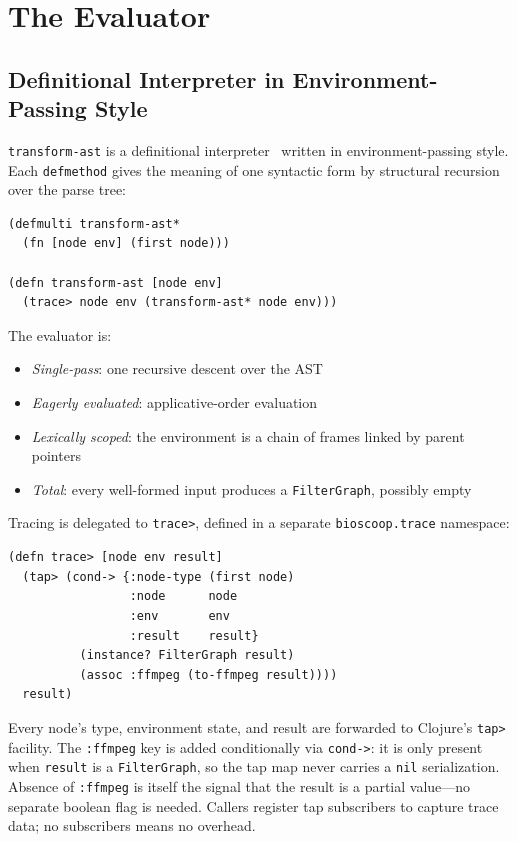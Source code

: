 \documentclass[english,submission]{programming}
\begin{document}
\section{The Evaluator}

\subsection{Definitional Interpreter in Environment-Passing Style}

\texttt{transform-ast} is a definitional interpreter~\cite{reynolds} written in environment-passing style. Each \texttt{defmethod} gives the meaning of one syntactic form by structural recursion over the parse tree:

\begin{lstlisting}[caption={The evaluator entry point}]
(defmulti transform-ast*
  (fn [node env] (first node)))

(defn transform-ast [node env]
  (trace> node env (transform-ast* node env)))
\end{lstlisting}

The evaluator is:

\begin{itemize}
\item \emph{Single-pass}: one recursive descent over the AST
\item \emph{Eagerly evaluated}: applicative-order evaluation
\item \emph{Lexically scoped}: the environment is a chain of frames linked by parent pointers
\item \emph{Total}: every well-formed input produces a \texttt{FilterGraph}, possibly empty
\end{itemize}

Tracing is delegated to \texttt{trace>}, defined in a separate \texttt{bioscoop.trace} namespace:

\begin{lstlisting}[caption={The trace> helper}]
(defn trace> [node env result]
  (tap> (cond-> {:node-type (first node)
                 :node      node
                 :env       env
                 :result    result}
          (instance? FilterGraph result)
          (assoc :ffmpeg (to-ffmpeg result))))
  result)
\end{lstlisting}

Every node's type, environment state, and result are forwarded to Clojure's \texttt{tap>} facility. The \texttt{:ffmpeg} key is added conditionally via \texttt{cond->}: it is only present when \texttt{result} is a \texttt{FilterGraph}, so the tap map never carries a \texttt{nil} serialization. Absence of \texttt{:ffmpeg} is itself the signal that the result is a partial value---no separate boolean flag is needed. Callers register tap subscribers to capture trace data; no subscribers means no overhead.
\end{document}
